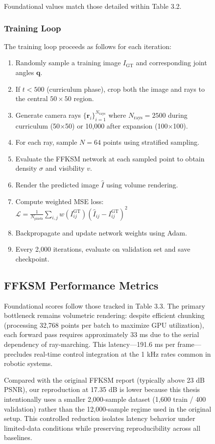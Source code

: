 \documentclass[12pt,a4paper,oneside]{report}
\begin{document}
\begin{figure}[H]
Foundational values match those detailed within Table 3.2.

\subsubsection{Training Loop}

The training loop proceeds as follows for each iteration:

\begin{enumerate}
    \item Randomly sample a training image $I_{\text{GT}}$ and corresponding joint angles $\mathbf{q}$.
    \item If $t < 500$ (curriculum phase), crop both the image and rays to the central $50 \times 50$ region.
    \item Generate camera rays $\{\mathbf{r}_i\}_{i=1}^{N_{\text{rays}}}$ where $N_{\text{rays}} = 2500$ during curriculum (50$\times$50) or 10,000 after expansion (100$\times$100).
    \item For each ray, sample $N=64$ points using stratified sampling.
    \item Evaluate the FFKSM network at each sampled point to obtain density $\sigma$ and visibility $v$.
    \item Render the predicted image $\hat{I}$ using volume rendering.
    \item Compute weighted MSE loss: $\mathcal{L} = \frac{1}{N_{\text{pixels}}} \sum_{i,j} w(I_{ij}^{\text{GT}}) (\hat{I}_{ij} - I_{ij}^{\text{GT}})^2$
    \item Backpropagate and update network weights using Adam.
    \item Every 2,000 iterations, evaluate on validation set and save checkpoint.
\end{enumerate}

\subsection{FFKSM Performance Metrics}

Foundational scores follow those tracked in Table 3.3. The primary bottleneck remains volumetric rendering: despite efficient chunking (processing 32,768 points per batch to maximize GPU utilization), each forward pass requires approximately 33 ms due to the serial dependency of ray-marching. This latency---191.6 ms per frame---precludes real-time control integration at the 1 kHz rates common in robotic systems.

Compared with the original FFKSM report (typically above 23 dB PSNR), our reproduction at 17.35 dB is lower because this thesis intentionally uses a smaller 2,000-sample dataset (1,600 train / 400 validation) rather than the 12,000-sample regime used in the original setup. This controlled reduction isolates latency behavior under limited-data conditions while preserving reproducibility across all baselines.


\end{figure}
\end{document}
